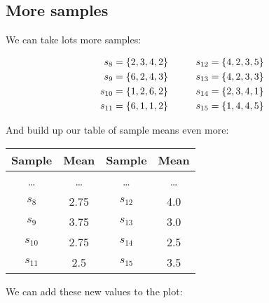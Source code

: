 \documentclass[../../../main.tex]{subfiles}
\begin{document}
\subsection{More samples}

We can take lots more samples:

\begin{align*}
  s_{8} = \{ 2, 3, 4, 2 \} \hskip 1cm s_{12} = \{ 4, 2, 3, 5 \} \\
  s_{9} = \{ 6, 2, 4, 3 \} \hskip 1cm s_{13} = \{ 4, 2, 3, 3 \} \\
  s_{10} = \{ 1, 2, 6, 2 \} \hskip 1cm s_{14} = \{ 2, 3, 4, 1 \} \\
  s_{11} = \{ 6, 1, 1, 2 \} \hskip 1cm s_{15} = \{ 1, 4, 4, 5 \}
\end{align*}

\noindent
And build up our table of sample means even more:

\begin{center}
  \begin{tabular}{| c | c || c | c |}
    \hline
    \textbf{Sample} & \textbf{Mean} & \textbf{Sample} & \textbf{Mean} \\ \hline
    \ldots & \ldots & \ldots & \ldots \\ \hline
    $s_{8}$ & 2.75 & $s_{12}$ & 4.0 \\ \hline
    $s_{9}$ & 3.75 & $s_{13}$ & 3.0 \\ \hline
    $s_{10}$ & 2.75 & $s_{14}$ & 2.5 \\ \hline
    $s_{11}$ & 2.5 & $s_{15}$ & 3.5 \\ \hline
  \end{tabular}
\end{center}

\noindent
We can add these new values to the plot: 

\begin{center}
\end{center}
\end{document}

